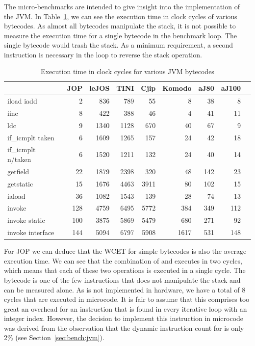 The micro-benchmarks are intended to give insight into the
implementation of the JVM. In Table~\ref{tab:results:bench:clock},
we can see the execution time in clock cycles of various bytecodes.
As almost all bytecodes manipulate the stack, it is not possible to
measure the execution time for a single bytecode in the benchmark
loop. The single bytecode would trash the stack. As a minimum
requirement, a second instruction is necessary in the loop to
reverse the stack operation.

\begin{table}
    \centering
    \begin{tabular*}{\columnwidth}{@{\extracolsep{\fill}}lrrrrrrrr}
        \toprule

                      & JOP & leJOS & TINI  & Cjip & Komodo & aJ80 & aJ100 \\
        \midrule
    iload iadd         & 2 & 836 & 789      & 55 & 8 & 38 & 8 \\
    iinc               & 8 & 422 & 388      & 46 & 4 & 41 & 11 \\
    ldc                & 9 & 1340 & 1128  & 670 & 40 & 67 & 9 \\
    if\_icmplt taken   & 6 & 1609 & 1265  & 157 & 24 & 42 & 18 \\
    if\_icmplt n/taken & 6 & 1520 & 1211  & 132 & 24 & 40 & 14 \\
    getfield           & 22 & 1879 & 2398 & 320 & 48 & 142 & 23 \\
    getstatic          & 15 & 1676 & 4463 & 3911 & 80 & 102 & 15 \\
    iaload             & 36 & 1082 & 1543 & 139 & 28 & 74 & 13 \\
    invoke             & 128 & 4759 & 6495& 5772 & 384 & 349 & 112 \\
    invoke static      & 100 & 3875 & 5869& 5479 & 680 & 271 & 92 \\
    invoke interface   & 144 & 5094 & 6797& 5908 & 1617 & 531 & 148 \\

        \bottomrule
    \end{tabular*}
    \caption{Execution time in clock cycles for various JVM bytecodes}
    \label{tab:results:bench:clock}
\end{table}

For JOP we can deduce that the WCET for simple bytecodes  is also the
average execution time. We can see that the combination of
 and  executes in two cycles, which means that
each of these two operations is executed in a single cycle. The
 bytecode is one of the few instructions that does not
manipulate the stack and can be measured alone. As  is not
implemented in hardware, we have a total of 8 cycles that are
executed in microcode. It is fair to assume that this comprises too
great an overhead for an instruction that is found in every iterative
loop with an integer index. However, the decision to implement this
instruction in microcode was derived from the observation that the
dynamic instruction count for  is only 2\% (see
Section~\ref{sec:bench:jvm}).

